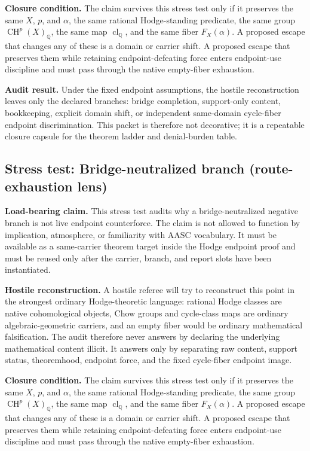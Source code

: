 \documentclass[11pt]{article}
\newcommand{\QQ}{\mathbb{Q}}
\newcommand{\CH}{\operatorname{CH}}
\newcommand{\clQ}{\operatorname{cl}_{\QQ}}
\begin{document}
\par\noindent\textbf{Closure condition.} The claim survives this stress test only if it preserves the same $X$, $p$, and $\alpha$, the same rational Hodge-standing predicate, the same group $\CH^p(X)_\QQ$, the same map $\clQ$, and the same fiber $F_X(\alpha)$. A proposed escape that changes any of these is a domain or carrier shift. A proposed escape that preserves them while retaining endpoint-defeating force enters endpoint-use discipline and must pass through the native empty-fiber exhaustion.

\par\noindent\textbf{Audit result.} Under the fixed endpoint assumptions, the hostile reconstruction leaves only the declared branches: bridge completion, support-only content, bookkeeping, explicit domain shift, or independent same-domain cycle-fiber endpoint discrimination. This packet is therefore not decorative; it is a repeatable closure capsule for the theorem ladder and denial-burden table.


\subsection{Stress test: Bridge-neutralized branch (route-exhaustion lens)}

\par\noindent\textbf{Load-bearing claim.} This stress test audits why a bridge-neutralized negative branch is not live endpoint counterforce. The claim is not allowed to function by implication, atmosphere, or familiarity with AASC vocabulary. It must be available as a same-carrier theorem target inside the Hodge endpoint proof and must be reused only after the carrier, branch, and report slots have been instantiated.

\par\noindent\textbf{Hostile reconstruction.} A hostile referee will try to reconstruct this point in the strongest ordinary Hodge-theoretic language: rational Hodge classes are native cohomological objects, Chow groups and cycle-class maps are ordinary algebraic-geometric carriers, and an empty fiber would be ordinary mathematical falsification. The audit therefore never answers by declaring the underlying mathematical content illicit. It answers only by separating raw content, support status, theoremhood, endpoint force, and the fixed cycle-fiber endpoint image.

\par\noindent\textbf{Closure condition.} The claim survives this stress test only if it preserves the same $X$, $p$, and $\alpha$, the same rational Hodge-standing predicate, the same group $\CH^p(X)_\QQ$, the same map $\clQ$, and the same fiber $F_X(\alpha)$. A proposed escape that changes any of these is a domain or carrier shift. A proposed escape that preserves them while retaining endpoint-defeating force enters endpoint-use discipline and must pass through the native empty-fiber exhaustion.
\end{document}
